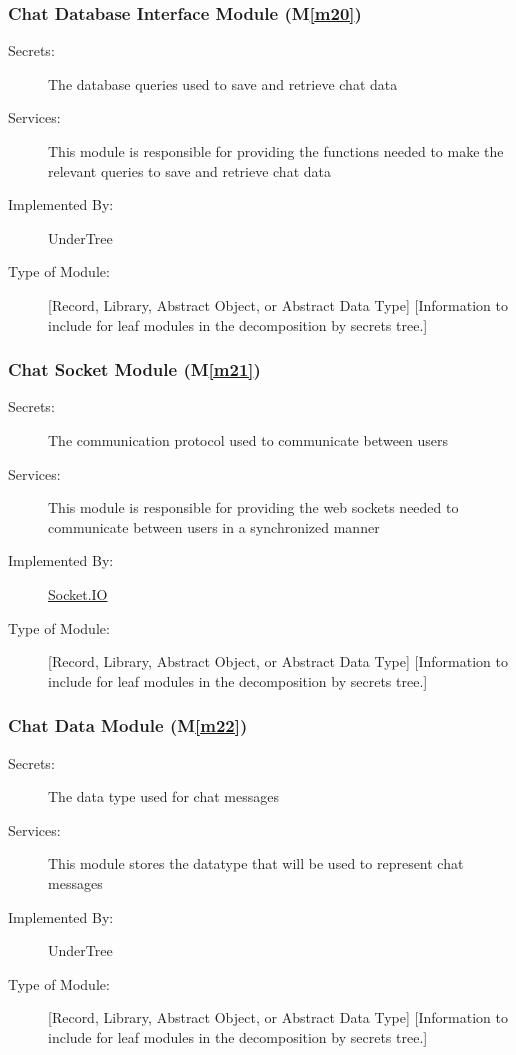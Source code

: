\documentclass[12pt, titlepage]{article}
\newcommand{\mref}[1]{M\ref{#1}}
\begin{document}
	\subsubsection{Chat Database Interface Module (\mref{m20})}
	
	\begin{description}
		\item[Secrets:] The database queries used to save and retrieve chat data
		\item[Services:] This module is responsible for providing the functions needed to make the relevant queries to save and retrieve chat data
		\item[Implemented By:] UnderTree
		\item[Type of Module:] [Record, Library, Abstract Object, or Abstract Data Type]
		[Information to include for leaf modules in the decomposition by secrets tree.]
	\end{description}
	
	\subsubsection{Chat Socket Module (\mref{m21})}
	
	\begin{description}
		\item[Secrets:] The communication protocol used to communicate between users
		\item[Services:] This module is responsible for providing the web sockets needed to communicate between users in a synchronized manner
		\item[Implemented By:] \href{https://socket.io/docs/v4/}{Socket.IO}
		\item[Type of Module:] [Record, Library, Abstract Object, or Abstract Data Type]
		[Information to include for leaf modules in the decomposition by secrets tree.]
	\end{description}
	
	\subsubsection{Chat Data Module (\mref{m22})}
	
	\begin{description}
		\item[Secrets:] The data type used for chat messages
		\item[Services:] This module stores the datatype that will be used to represent chat messages
		\item[Implemented By:] UnderTree
		\item[Type of Module:] [Record, Library, Abstract Object, or Abstract Data Type]
		[Information to include for leaf modules in the decomposition by secrets tree.]
	\end{description}
	
\end{document}
